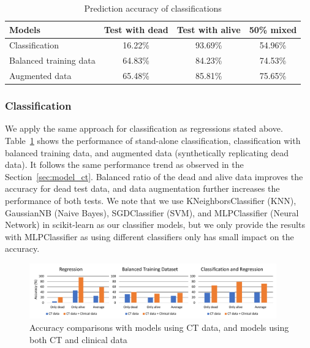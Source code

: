 \begin{table}[!h]
    \centering
    \caption{Prediction accuracy of classifications}
    \begin{tabular}{l||c|c|c}
        \toprule[0.8pt]
         \textbf{Models} & \textbf{Test with dead} & \textbf{Test with alive} & \textbf{50\% mixed} \\\hline
         Classification             & 16.22\% & 93.69\% & 54.96\% \\
         Balanced training data  & 64.83\% & 84.23\% & 74.53\% \\
         Augmented data          & 65.48\% & 85.81\% & 75.65\%\\
        \bottomrule[0.8pt]
    \end{tabular}
    \label{tab:classification}
\end{table}


\subsubsection{Classification}
\label{sec:classification}
We apply the same approach for classification as regressions stated above.
Table~\ref{tab:classification} shows the performance of stand-alone classification, classification with balanced training data, and augmented data (synthetically replicating dead data).
It follows the same performance trend as observed in the Section~\ref{sec:model_ct}.
Balanced ratio of the dead and alive data improves the accuracy for dead test data, and data augmentation further increases the performance of both tests.
We note that we use KNeighborsClassifier (KNN), GaussianNB (Naive Bayes), SGDClassifier (SVM), and MLPClassifier (Neural Network) in scikit-learn as our classifier models, but we only provide the results with MLPClassifier as using different classifiers only has small impact on the accuracy.


\begin{figure}[!h]
    \centering
    \includegraphics[width=0.95\textwidth]{figures/clinical.pdf}
    \caption{Accuracy comparisons with models using CT data, and models using both CT and clinical data}
    \label{fig:clinical}
\end{figure}


